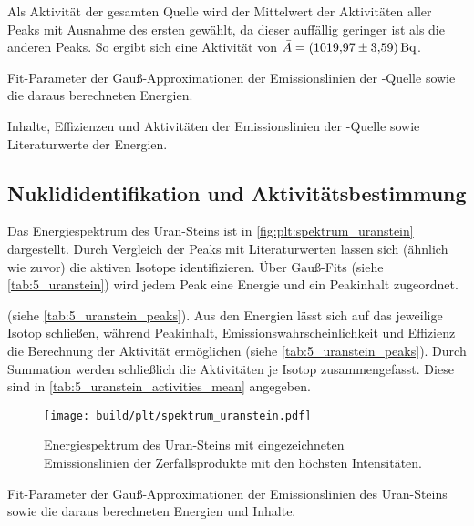 Als Aktivität der gesamten Quelle wird der Mittelwert der Aktivitäten aller Peaks mit Ausnahme des ersten gewählt,
    da dieser auffällig geringer ist als die anderen Peaks.
So ergibt sich eine Aktivität von $\bar A = \SI{1019.97 \pm 3.59}{\becquerel}$.

\begin{table}
    \centering
    \caption{
        Fit-Parameter der Gauß-Approximationen der Emissionslinien der -Quelle
        sowie die daraus berechneten Energien.
    }
    \label{tab:4_Ba_133}
\end{table}

\begin{table}
    \centering
    \caption{
        Inhalte, Effizienzen und Aktivitäten der Emissionslinien der -Quelle
        sowie Literaturwerte der Energien.
    }
    \label{tab:4_Ba_133_activities}
\end{table}


\FloatBarrier
\subsection{Nuklididentifikation und Aktivitätsbestimmung} \label{sec:auswertung:uranstein}
Das Energiespektrum des Uran-Steins ist in \autoref{fig:plt:spektrum_uranstein} dargestellt.
Durch Vergleich der Peaks mit Literaturwerten lassen sich
    (ähnlich wie zuvor)
die aktiven Isotope identifizieren.
Über Gauß-Fits (siehe \autoref{tab:5_uranstein})
wird jedem Peak eine Energie und ein Peakinhalt zugeordnet.

(siehe \autoref{tab:5_uranstein_peaks}).
Aus den Energien lässt sich auf das jeweilige Isotop schließen,
während Peakinhalt, Emissionswahrscheinlichkeit und Effizienz die Berechnung der Aktivität ermöglichen
    (siehe \autoref{tab:5_uranstein_peaks}).
Durch Summation werden schließlich die Aktivitäten je Isotop zusammengefasst.
Diese sind in \autoref{tab:5_uranstein_activities_mean} angegeben.

\begin{figure}
    \centering
    \texttt{[image: build/plt/spektrum\_uranstein.pdf]}
    \caption{Energiespektrum des Uran-Steins mit eingezeichneten Emissionslinien der Zerfallsprodukte mit den höchsten Intensitäten.}
    \label{fig:plt:spektrum_uranstein}
\end{figure}

\begin{table}
    \centering
    \caption{
        Fit-Parameter der Gauß-Approximationen der Emissionslinien des Uran-Steins
        sowie die daraus berechneten Energien und Inhalte.
    }
    \label{tab:5_uranstein}
\end{table}

